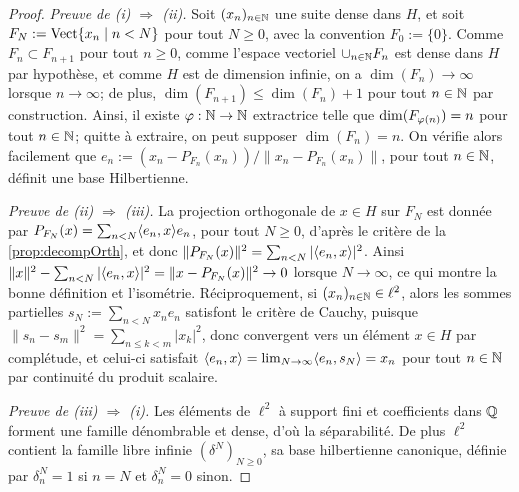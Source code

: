 \begin{proof}
	\emph{Preuve de (i) $\Rightarrow$ (ii).} Soit $(x_n)_{n \in \mathbb{N}}$ une suite dense dans $H$, et soit $F_N := \operatorname{Vect}\{x_n \mid n < N\}$ pour tout $N \geq 0$, avec la convention $F_0:=\{0\}$.
	Comme $F_n \subset F_{n+1}$ pour tout $n \geq 0$, comme l'espace vectoriel $\cup_{n \in \mathbb{N}} F_n$ est dense dans $H$ par hypothèse, et comme $H$ est de dimension infinie, on a $\dim(F_n) \to \infty$ lorsque $n \to \infty$; de plus, $\dim(F_{n+1}) \leq \dim(F_n)+1$ pour tout $n \in \mathbb{N}$ par construction. 
	Ainsi, il existe $\varphi : \mathbb{N} \to \mathbb{N}$ extractrice telle que $\dim(F_{\varphi(n)}) = n$ pour tout $n \in \mathbb{N}$; quitte à extraire, on peut supposer $\dim(F_n) = n$. 
	On vérifie alors facilement que $e_n := (x_n - P_{F_n}(x_n)) / \|x_n - P_{F_n}(x_n)\|$, pour tout $n \in \mathbb{N}$, définit une base Hilbertienne.
	
	\emph{Preuve de (ii) $\Rightarrow$ (iii).}
	La projection orthogonale de $x \in H$ sur $F_N$ est donnée par $P_{F_N}(x) = \sum_{n< N} \langle e_n,x\rangle e_n$, pour tout $N \geq 0$, d'après le critère de la \cref{prop:decompOrth}, et donc $\|P_{F_N}(x)\|^2 = \sum_{n<N} |\langle e_n,x\rangle|^2$. 
	Ainsi $\|x\|^2 - \sum_{n<N} |\langle e_n,x\rangle|^2 = \|x-P_{F_N}(x)\|^2 \to 0$ lorsque $N \to \infty$, ce qui montre la bonne définition et l'isométrie.
	Réciproquement, si $(x_n)_{n\in \mathbb{N}} \in \ell^2$, alors les sommes partielles $s_N := \sum_{n<N} x_n e_n$ satisfont le critère de Cauchy, puisque $\|s_n-s_m\|^2 = \sum_{n\leq k <m} |x_k|^2$, donc convergent vers un élément $x\in H$ par complétude, et celui-ci satisfait $\langle e_n,x\rangle = \lim_{N \to \infty} \langle e_n,s_N\rangle = x_n$ pour tout $n \in \mathbb{N}$ par continuité du produit scalaire.
	
	\emph{Preuve de (iii) $\Rightarrow$ (i).} Les éléments de $\ell^2$ à support fini et coefficients dans $\mathbb{Q}$ forment une famille dénombrable et dense, d'où la séparabilité. De plus $\ell^2$ contient la famille libre infinie  $(\delta^N)_{N\geq 0}$, sa base hilbertienne canonique, définie par $\delta^N_n = 1$ si $n=N$ et $\delta^N_n = 0$ sinon.
\end{proof}

